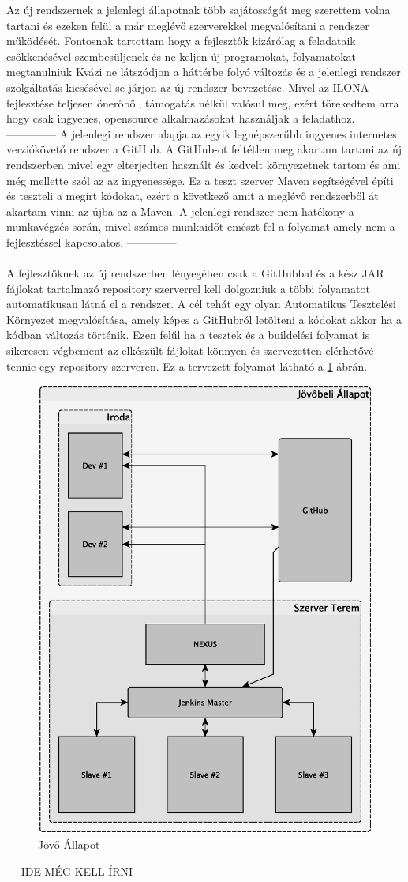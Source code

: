 Az új rendszernek a jelenlegi állapotnak több sajátosságát meg szerettem volna tartani és ezeken felül a már meglévő szerverekkel megvalósítani a rendszer működését. 
Fontosnak tartottam hogy a fejlesztők kizárólag a feladataik csökkenésével szembesüljenek és ne keljen új programokat, folyamatokat megtanulniuk 
Kvázi ne látszódjon a háttérbe folyó változás és a jelenlegi rendszer szolgáltatás kiesésével se járjon az új rendszer bevezetése. 
Mivel az ILONA fejlesztése teljesen önerőből, támogatás nélkül valósul meg, ezért törekedtem arra hogy csak ingyenes, opensource alkalmazásokat használjak a feladathoz. 
--------------
A jelenlegi rendszer alapja az egyik legnépszerűbb ingyenes internetes verziókövető rendszer a GitHub. 
A GitHub-ot feltétlen meg akartam tartani az új rendszerben mivel egy elterjedten használt és kedvelt környezetnek tartom és ami még mellette szól az az ingyenessége. 
Ez a teszt szerver Maven segítségével építi és teszteli a megírt kódokat, ezért a következő amit a meglévő rendszerből át akartam vinni az újba az a Maven. 
A jelenlegi rendszer nem hatékony a munkavégzés során, mivel számos munkaidőt emészt fel a folyamat amely nem a fejlesztéssel kapcsolatos. 
--------------
\pagebreak
\paragraph{}
A fejlesztőknek az új rendszerben lényegében csak a GitHubbal és a kész JAR fájlokat tartalmazó repository szerverrel kell dolgozniuk a többi folyamatot automatikusan látná el a rendszer. 
A cél tehát egy olyan Automatikus Tesztelési Környezet megvalósítása, amely képes a GitHubról letölteni a kódokat akkor ha a kódban változás történik. 
Ezen felűl ha a tesztek és a buildelési folyamat is sikeresen végbement az elkészült fájlokat könnyen és szervezetten elérhetővé tennie egy repository szerveren. 
Ez a tervezett folyamat látható a \ref{fig:jovoallapot} ábrán. 


\begin{figure}[h]
	\centering
	\includegraphics[width=0.7\linewidth]{figures/jovoallapot}
	\caption{Jövő Állapot}
	\label{fig:jovoallapot}
\end{figure}

--- IDE MÉG KELL ÍRNI ---
